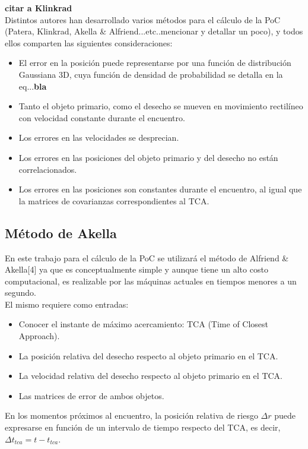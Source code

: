 {\bf{citar a Klinkrad}}
\\
Distintos autores han desarrollado varios m\'etodos para el c\'alculo de la PoC (Patera, Klinkrad, Akella \& Alfriend...etc..mencionar y detallar un poco), y todos ellos comparten las siguientes consideraciones:\\
\begin{itemize}
 \item El error en la posici\'on puede representarse por una funci\'on de distribuci\'on Gaussiana 3D, cuya funci\'on de densidad de probabilidad se detalla en la eq...{\bf{bla}} 
 \item Tanto el objeto primario, como el desecho se mueven en movimiento rectil\'ineo con velocidad constante durante el encuentro.
 \item Los errores en las velocidades se desprecian.
 \item Los errores en las posiciones del objeto primario y del desecho no est\'an correlacionados.
 \item Los errores en las posiciones son constantes durante el encuentro, al igual que la matrices de covarianzas correspondientes al TCA.
\end{itemize}

\subsection*{M\'etodo de Akella}
En este trabajo para el c\'alculo de la PoC se utilizar\'a el m\'etodo de Alfriend \& Akella[4] ya que es conceptualmente simple y aunque tiene un alto costo computacional, es realizable por las m\'aquinas actuales en tiempos menores a un segundo.\\

El mismo requiere como entradas:
\begin{itemize}
 \item Conocer el instante de m\'aximo acercamiento: TCA (Time of Closest Approach).
 \item La posici\'on relativa del desecho respecto al objeto primario en el TCA.
 \item La velocidad relativa del desecho respecto al objeto primario en el TCA.
 \item Las matrices de error de ambos objetos.
\end{itemize}

En los momentos pr\'oximos al encuentro, la posici\'on relativa de riesgo $\Delta r$ puede expresarse en funci\'on de un intervalo de tiempo respecto del TCA, es decir, $\Delta t_{tca}=t-t_{tca}$.

